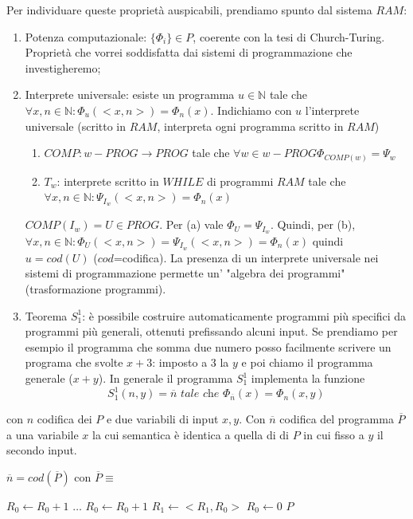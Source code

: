 \documentclass{article}
\begin{document}
Per individuare queste proprietà auspicabili, prendiamo spunto dal sistema $RAM$:
\begin{enumerate}
	\item Potenza computazionale: $\{ \Phi_i \} \in P$, coerente con la tesi di Church-Turing. Proprietà che vorrei soddisfatta dai sistemi di programmazione che investigheremo;
	\item Interprete universale: esiste un programma $u \in \mathbb{N}$ tale che $\forall x,n \in \mathbb{N}:\Phi_u(<x,n>)=\Phi_n(x)$. Indichiamo con $u$ l'interprete universale (scritto in $RAM$, interpreta ogni programma scritto in $RAM$)
	\begin{enumerate}
		\item $COMP: w-PROG \rightarrow PROG$ tale che $\forall w \in w-PROG \Phi_{COMP(w)}=\Psi_w$
		\item $T_w$: interprete scritto in $WHILE$ di programmi $RAM$ tale che $\forall x,n \in \mathbb{N}:\Psi_{I_w}(<x,n>)=\Phi_n(x)$
	\end{enumerate}
	$COMP(I_w)=U\in PROG$. Per (a) vale $\Phi_U=\Psi_{I_w}$. Quindi, per (b), $\forall x,n \in \mathbb{N}: \Phi_U(<x,n>)=\Psi_{I_w}(<x,n>)=\Phi_n(x)$ quindi $u=cod(U)$ ($cod$=codifica). La presenza di un interprete universale nei sistemi di programmazione permette un' "algebra dei programmi" (trasformazione programmi).
	
	
	
	\item Teorema $S_1^1$: è possibile costruire automaticamente programmi più specifici da programmi più generali, ottenuti prefissando alcuni input. Se prendiamo per esempio il programma che somma due numero posso facilmente scrivere un programa che svolte $x+3$: imposto a 3 la $y$ e poi chiamo il programma generale ($x+y$).
	In generale il programma $S_1^1$ implementa la funzione
	\begin{displaymath}
		S_1^1(n,y)=\overline{n} \textit{ tale che } \Phi_{\overline{n}}(x)=\Phi_n(x,y)
	\end{displaymath}
\end{enumerate}
con $n$ codifica dei $P$ e due variabili di input $x, y$. Con $\overline{n}$ codifica del programma $\overline{P}$ a una variabile $x$ la cui semantica è identica a quella di di $P$ in cui fisso a $y$ il secondo input.

\begin{algorithm}[h]
	\caption{$\overline{n}=cod(\overline{P})$ con $\overline{P} \equiv$}
        \begin{algorithmic}[1]
        		 \State $R_0 \leftarrow R_0+1$
        		 \State $\dots$
        		 \State $R_0 \leftarrow R_0+1$ 
        		 \State $R_1 \leftarrow <R_1,R_0>$ 
        		 \State $R_0 \leftarrow 0$ 
        		 \State $P$ 
        \end{algorithmic}
    \end{algorithm}
    
\end{document}
